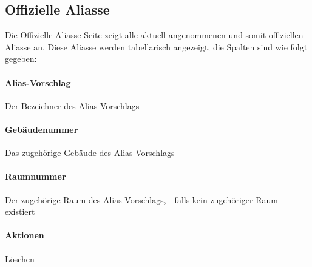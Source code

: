 \subsection{Offizielle Aliasse}

Die Offizielle-Aliasse-Seite zeigt alle aktuell angenommenen und somit offiziellen Aliasse an.
Diese Aliasse werden tabellarisch angezeigt, die Spalten sind wie folgt gegeben:

\paragraph*{Alias-Vorschlag} 
    Der Bezeichner des Alias-Vorschlags
\paragraph*{Gebäudenummer} 
    Das zugehörige Gebäude des Alias-Vorschlags
\paragraph*{Raumnummer} 
    Der zugehörige Raum des Alias-Vorschlags, \dq - \dq{} falls kein zugehöriger Raum existiert
\paragraph*{Aktionen} 
    Löschen